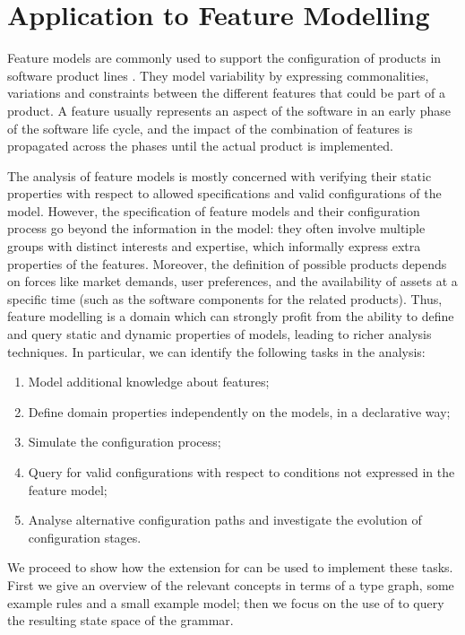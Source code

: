 
\section{Application to Feature Modelling}

Feature models \cite{Kang1990} are commonly used to support the configuration
of products in software product lines \cite{Pohl2005}. They model variability
by expressing commonalities, variations and constraints between the different
features that could be part of a product. A feature usually represents an
aspect of the software in an early phase of the software life cycle, and the
impact of the combination of features is propagated across the phases until the
actual product is implemented.

The analysis of feature models \cite{Benavides2005,Broek2009} is mostly
concerned with verifying their static properties with respect to allowed
specifications and valid configurations of the model. However, the
specification of feature models and their configuration process go beyond the
information in the model: they often involve multiple groups with distinct
interests and expertise, which informally express extra properties of the
features. Moreover, the definition of possible products depends on forces like
market demands, user preferences, and the availability of assets at a specific
time (such as the software components for the related products). Thus, feature
modelling is a domain which can strongly profit from the ability to define and
query static and dynamic properties of models, leading to richer analysis
techniques. In particular, we can identify the following tasks in the analysis:
%
\begin{enumerate}\noitemsep\label{options}
\item Model additional knowledge about features;
\item Define domain properties independently on the models, in a declarative
  way;
\item Simulate the configuration process;
\item Query for valid configurations with respect to conditions not expressed
  in the feature model;
\item\label{staged} Analyse alternative configuration paths and investigate the
  evolution of configuration stages.
\end{enumerate}
%
We proceed to show how the \Prolog extension for \GROOVE can be used to
implement these tasks. First we give an overview of the relevant concepts in
terms of a type graph, some example rules and a small example model; then we
focus on the use of \Prolog to query the resulting state space of the grammar.
